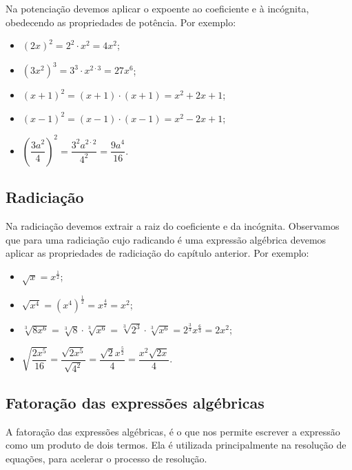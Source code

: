   Na potenciação devemos aplicar o expoente ao coeficiente e à incógnita, obedecendo as propriedades de potência. Por exemplo:

    \begin{itemize}
     \item $(2x)^2= 2^2 \cdot x^2= 4x^2$;
     \item $(3x^2)^3= 3^3 \cdot x^{2\cdot 3}= 27x^6$;
     \item $(x+1)^2= (x+1) \cdot (x+1)= x^2 + 2x +1$;
     \item $(x-1)^2= (x-1) \cdot (x-1)= x^2 - 2x +1$;
     \item $\left(\dfrac{3a^2}{4}\right)^2= \dfrac{3^2 a^{2 \cdot 2}}{4^2}= \dfrac{9a^4}{16}$.
    \end{itemize}


  \subsection{Radiciação}

  Na radiciação devemos extrair a raiz do coeficiente e da incógnita. Observamos que para uma radiciação cujo radicando é uma expressão algébrica devemos aplicar as propriedades de radiciação do capítulo anterior. Por exemplo:
    \begin{itemize}
     \item $\sqrt{x}= x^{\frac{1}{2}}$;
     \item $\sqrt{x^4}= (x^4)^{\frac{1}{2}}= x^{\frac{4}{2}}= x^2$;
     \item $\sqrt[3]{8x^6}= \sqrt[3]{8} \cdot \sqrt[3]{x^6}=\sqrt[3]{2^3} \cdot \sqrt[3]{x^6} = 2^{\frac{3}{3}} x^{\frac{6}{3}}= 2x^2$;
     \item $\sqrt{\dfrac{2x^5}{16}}= \dfrac{\sqrt{2x^5}}{\sqrt{4^2}}= \dfrac{\sqrt{2} x^{\frac{5}{2}}}{4}= \dfrac{x^{2} \sqrt{2x}}{4}$.
     
    \end{itemize}


  \subsection{Fatoração das expressões algébricas}


 A fatoração das expressões algébricas, é o que nos permite escrever a expressão como um produto de dois termos. Ela é utilizada principalmente na resolução de equações, para acelerar o processo de resolução.

